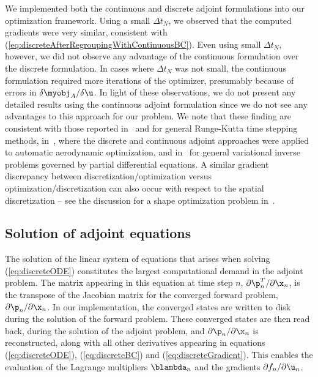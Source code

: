 We implemented both the continuous and discrete adjoint formulations into our
optimization framework. Using a small $\Delta t_N$, we observed that the
computed gradients were very similar, consistent with
(\ref{eq:discreteAfterRegroupingWithContinuousBC}). Even using small $\Delta
t_N$, however, we did not observe any advantage of the continuous formulation
over the discrete formulation. In cases where $\Delta t_N$ was not small, the
continuous formulation required more iterations of the optimizer, presumably
because of errors in $\delta \myobj_A / \delta \u$. In light of these observations,
we do not present any detailed results using the continuous adjoint
formulation since we do not see any advantages to this approach for our
problem. We note that these finding are consistent with those reported
in~\cite{Hager2000} and \cite{Walther2007} for general Runge-Kutta
time stepping methods, 
in~\cite{Nadarajah:2000}, where the discrete and continuous adjoint
approaches were applied to automatic  aerodynamic optimization, and
in~\cite{Petra2011} for general variational inverse problems governed
by partial differential equations. A
 similar gradient discrepancy between discretization/optimization
 versus optimization/discretization can also occur with respect to the
 spatial discretization -- see the discussion for a shape
 optimization problem in~\cite{GunzburgerBook}. 



\subsection{Solution of adjoint equations} The solution of the linear system of
equations that arises when solving (\ref{eq:discreteODE}) constitutes the
largest computational demand in the adjoint problem. The matrix appearing in
this equation at time step $n$, $\partial {\p_n^T}/\partial {\x_n}$, is
the transpose of the Jacobian matrix for the converged forward problem,
    $\partial {\p_n}/\partial {\x_n}$. In our implementation, the converged
    states are written to disk during the solution of the forward problem. These
converged states are then read back, during the solution of the adjoint problem,
          and $\partial {\p_n}/\partial {\x_n}$ is reconstructed, along with all
other derivatives appearing in equations (\ref{eq:discreteODE}),
      (\ref{eq:discreteBC}) and (\ref{eq:discreteGradient}). This enables the
      evaluation of the Lagrange multipliers $\blambda_n$ and the gradients
      $\partial f_n/\partial {\u_n}$.


